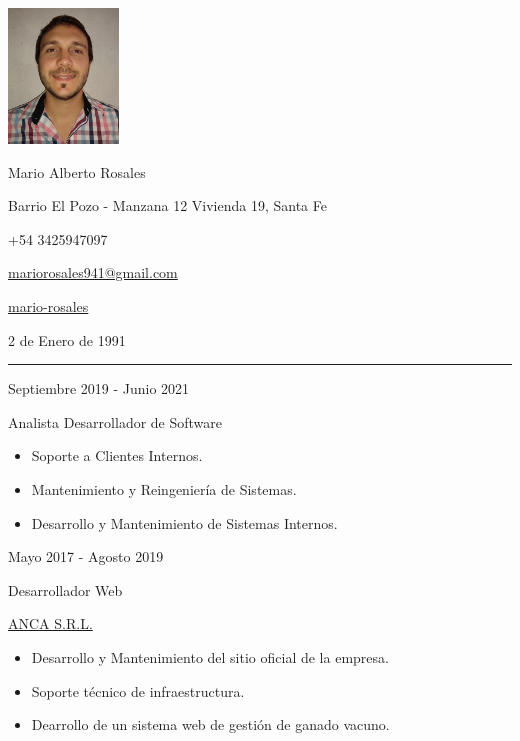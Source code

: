 \documentclass[a4paper,10pt]{article}
\newlength{\cvcolumngapwidth}
\newlength{\cvleftcolumnwidth}
\newlength{\cvrightcolumnwidth}
\newcommand{\cvnamestyle}[1]{{\Large\cvnamefont\textcolor{cvnamecolor}{#1}}}
\newcommand{\cvsectionstyle}[1]{{\normalsize\cvsectionfont\textcolor{cvsectioncolor}{#1}}}
\newcommand{\cvtitlestyle}[1]{{\large\cvtitlefont\textcolor{cvtitlecolor}{#1}}}
\newcommand{\cvdurationstyle}[1]{{\small\cvdurationfont\textcolor{cvdurationcolor}{#1}}}
\newlength{\cvafteritemskipamount}
\newlength{\cvaftersectionskipamount}
\newlength{\cvafternameskipamount}
\newlength{\cvafterpersonalinfolineskipamount}
\newlength{\cvaftertitleskipamount}
\newlength{\cvparskip}
\newcommand{\cvpersonalinfo}[2]{
    \begin{minipage}[t]{\cvleftcolumnwidth}
        \vspace{0mm} %
        \raggedleft #1
    \end{minipage}%
    \hspace{\cvcolumngapwidth}%
    \begin{minipage}[t]{\cvrightcolumnwidth}
        \vspace{0mm} %
        #2
    \end{minipage}

    \vspace{\cvafteritemskipamount}
}
\newcommand{\cvname}[1]{
    \cvnamestyle{#1}

    \vspace{\cvafternameskipamount}
}
\newcommand{\cvpersonalinfolinewithicon}[3]{
    \raisebox{.5\fontcharht\font`E-.5\height}{\texttt{[image: \#2]}}
    #3

    \vspace{\cvafterpersonalinfolineskipamount}
}
\newcommand{\cvsection}[1]{
    \begin{minipage}[t]{\cvleftcolumnwidth}
        \raggedleft\cvsectionstyle{#1}
    \end{minipage}%
    \hspace{\cvcolumngapwidth}%
    \begin{minipage}[t]{\cvrightcolumnwidth}
        \textcolor{cvrulecolor}{\rule{\cvrightcolumnwidth}{0.3mm}}
    \end{minipage}

    \vspace{\cvaftersectionskipamount}
}
\newcommand{\cvitem}[2]{
    \begin{minipage}[t]{\cvleftcolumnwidth}
        \raggedleft #1
    \end{minipage}%
    \hspace{\cvcolumngapwidth}%
    \begin{minipage}[t]{\cvrightcolumnwidth}
        \setlength{\parskip}{\cvparskip} #2
    \end{minipage}

    \vspace{\cvafteritemskipamount}
}
\newcommand{\cvtitle}[1]{
    \cvtitlestyle{#1}

    \vspace{\cvaftertitleskipamount}
    \vspace{-\cvparskip}
}
\begin{document}

\cvpersonalinfo{
    \includegraphics[height=36mm]{photo.jpg}
}{
    \cvname{Mario Alberto Rosales}

    \cvpersonalinfolinewithicon{height=4mm}{072-location.pdf}{
        Barrio El Pozo - Manzana 12 Vivienda 19, Santa Fe
    }

    \cvpersonalinfolinewithicon{height=4mm}{067-phone.pdf}{
        +54 3425947097
    }

    \cvpersonalinfolinewithicon{height=4mm}{070-envelop.pdf}{
        \href{mailto:mariorosales941@gmail.com}{mariorosales941@gmail.com}
    }

    \cvpersonalinfolinewithicon{height=4mm}{458-linkedin.pdf}{
        \href{https://www.linkedin.com/in/mario-rosales/}{mario-rosales}
    }

    2 de Enero de 1991
}



\cvsection{EXPERIENCIA LABORAL}

\cvitem{
    \cvdurationstyle{Septiembre 2019 - Junio 2021}
}{
    \cvtitle{Analista Desarrollador de Software}
    \begin{itemize}
        \item Soporte a Clientes Internos.
        \item Mantenimiento y Reingeniería de Sistemas. 
        \item Desarrollo y Mantenimiento de Sistemas Internos.
    \end{itemize}
}

\cvitem{
    \cvdurationstyle{Mayo 2017 - Agosto 2019}
}{
    \cvtitle{Desarrollador Web}
    \href{https://ancasrl.com.ar/}{ANCA S.R.L.}
    \begin{itemize}
        \item Desarrollo y Mantenimiento del sitio oficial de la empresa.
        \item Soporte técnico de infraestructura.
        \item Dearrollo de un sistema web de gestión de ganado vacuno.
    \end{itemize}
}
\end{document}
